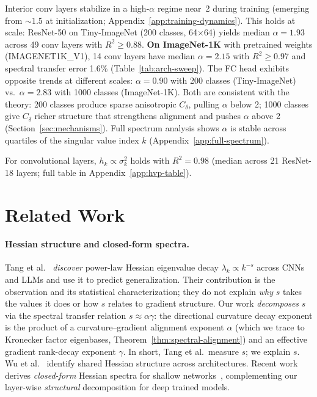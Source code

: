 \documentclass{article}
\begin{document}
\noindent Interior conv layers stabilize in a high-$\alpha$ regime near~2 during training (emerging from $\sim 1.5$ at initialization; Appendix~\ref{app:training-dynamics}). This holds at scale: ResNet-50 on Tiny-ImageNet (200 classes, 64$\times$64) yields median $\alpha = 1.93$ across 49 conv layers with $R^2 \geq 0.88$. \textbf{On ImageNet-1K} with pretrained weights (IMAGENET1K\_V1), 14 conv layers have median $\alpha = 2.15$ with $R^2 \geq 0.97$ and spectral transfer error 1.6\% (Table~\ref{tab:arch-sweep}). The FC head exhibits opposite trends at different scales: $\alpha = 0.90$ with 200 classes (Tiny-ImageNet) vs.\ $\alpha = 2.83$ with 1000 classes (ImageNet-1K). Both are consistent with the theory: 200 classes produce sparse anisotropic $C_\delta$, pulling $\alpha$ below 2; 1000 classes give $C_\delta$ richer structure that strengthens alignment and pushes $\alpha$ above 2 (Section~\ref{sec:mechanisms}). Full spectrum analysis shows $\alpha$ is stable across quartiles of the singular value index $k$ (Appendix~\ref{app:full-spectrum}).

For convolutional layers, $h_k \propto \sigma_k^2$ holds with $R^2 = 0.98$ (median across 21 ResNet-18 layers; full table in Appendix~\ref{app:hvp-table}).

\section{Related Work}\label{sec:related}

\paragraph{Hessian structure and closed-form spectra.}
Tang et al.~\cite{tang2025hessian} \emph{discover} power-law Hessian eigenvalue decay $\lambda_k \propto k^{-s}$ across CNNs and LLMs and use it to predict generalization. Their contribution is the observation and its statistical characterization; they do not explain \emph{why} $s$ takes the values it does or how $s$ relates to gradient structure. Our work \emph{decomposes} $s$ via the spectral transfer relation $s \approx \alpha\gamma$: the directional curvature decay exponent is the product of a curvature--gradient alignment exponent $\alpha$ (which we trace to Kronecker factor eigenbases, Theorem~\ref{thm:spectral-alignment}) and an effective gradient rank-decay exponent $\gamma$. In short, Tang et al.\ measure $s$; we explain $s$. Wu et al.~\cite{wu2020dissecting} identify shared Hessian structure across architectures. Recent work derives \emph{closed-form} Hessian spectra for shallow networks~\cite{singh2026cracking}, complementing our layer-wise \emph{structural} decomposition for deep trained models.
\end{document}
